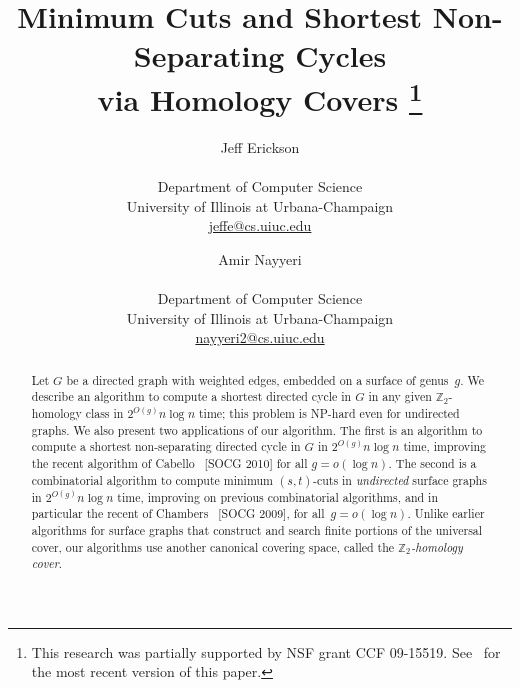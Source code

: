\documentclass[twoside,leqno,twocolumn]{article}
\def\Z{\mathbb{Z}}
\begin{document}
\title{Minimum Cuts and Shortest Non-Separating Cycles\\
	 via Homology Covers%
\thanks{This research was partially supported by NSF grant CCF 09-15519.  See \paperURL\ for the most recent version of this paper.}}

\author{
	Jeff Erickson\\[1ex]
	\normalsize
	\begin{tabular}{c}
	Department of Computer Science\\
	University of Illinois at Urbana-Champaign\\
	\protect\url{jeffe@cs.uiuc.edu}
	\end{tabular}
	\and
	Amir Nayyeri	\\[1ex]
	\normalsize
	\begin{tabular}{c}
	Department of Computer Science\\
	University of Illinois at Urbana-Champaign\\
	\protect\url{nayyeri2@cs.uiuc.edu}
	\end{tabular}
}


\maketitle


\begin{abstract}
Let $G$ be a directed graph with weighted edges, embedded on a surface of genus~$g$.  We describe an algorithm to compute a shortest directed cycle in $G$ in any given $\Z_2$-homology class in $2^{O(g)}n\log n$ time; this problem is {NP}-hard even for undirected graphs.  We also present two applications of our algorithm.  The first is an algorithm to compute a shortest non-separating directed cycle in $G$ in $2^{O(g)} n\log n$ time, improving the recent algorithm of Cabello \etal\ [SOCG 2010] for all $g=o(\log n)$.  The second is a combinatorial algorithm to compute minimum $(s,t)$-cuts in \emph{undirected} surface graphs in $2^{O(g)} n\log n$ time, improving on previous combinatorial algorithms, and in particular the recent  of Chambers \etal\ [SOCG 2009], for all~$g = o(\log n)$.  Unlike earlier algorithms for surface graphs that construct and search finite portions of the universal cover, our algorithms use another canonical covering space, called  the \emph{$\Z_2$-homology cover}.
\end{abstract}


\end{document}
